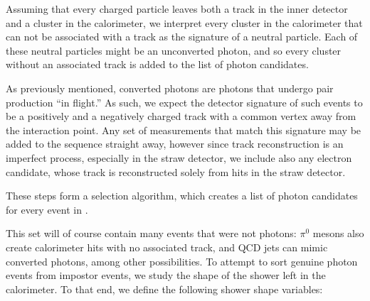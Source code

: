 Assuming that every charged particle leaves both a track in the inner detector and a cluster in the calorimeter, we interpret every cluster in the calorimeter that can not be associated with a track as the signature of a neutral particle. Each of these neutral particles might be an unconverted photon, and so every cluster without an associated track is added to the list of photon candidates.

As previously mentioned, converted photons are photons that undergo pair production ``in flight.'' As such, we expect the detector signature of such events to be a positively and a negatively charged track with a common vertex away from the interaction point. Any set of measurements that match this signature may be added to the sequence straight away, however since track reconstruction is an imperfect process, especially in the straw detector, we include also any electron candidate, whose track is reconstructed solely from hits in the straw detector.

These steps form a selection algorithm, which creates a list of photon candidates for every event in \atlas{} \cite{phorec}.

This set will of course contain many events that were not photons: $\pi^0$ mesons also create calorimeter hits with no associated track, and QCD jets can mimic converted photons, among other possibilities. To attempt to sort genuine photon events from impostor events, we study the shape of the shower left in the calorimeter. To that end, we define the following shower shape variables:

